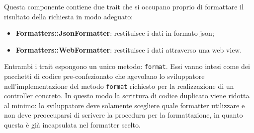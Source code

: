 Questa componente contiene due \gls{trait}\glsfirstoccur{} che si occupano proprio di formattare il risultato della richiesta in modo adeguato:
\begin{itemize}
	\item \textbf{Formatters::JsonFormatter}: restituisce i dati in formato \gls{json}\glsfirstoccur{};
	\item \textbf{Formatters::WebFormatter}: restituisce i dati attraverso una web view.
\end{itemize}

Entrambi i \gls{trait}\glsfirstoccur{} espongono un unico metodo: \verb!format!. Essi vanno intesi come dei pacchetti di codice pre-confezionato che agevolano lo sviluppatore nell'implementazione del metodo \verb!format! richiesto per la realizzazione di un controller concreto. In questo modo la scrittura di codice duplicato viene ridotta al minimo: lo sviluppatore deve solamente scegliere quale formatter utilizzare e non deve preoccuparsi di scrivere la procedura per la formattazione, in quanto questa è già incapsulata nel formatter scelto.





